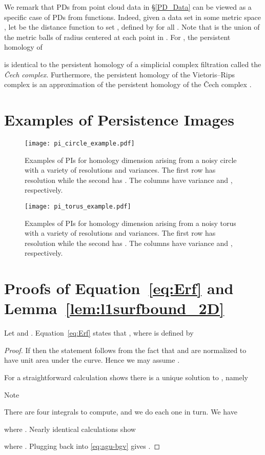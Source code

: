 \documentclass[11pt]{article}
\begin{document}
We remark that PDs from point cloud data in \S\ref{PD_Data} can be viewed as a specific case of PDs from functions. Indeed, given a data set  in some metric space , let  be the distance function to set , defined by  for all . Note that  is the union of the metric balls of radius  centered at each point in . For , the persistent homology of


is identical to the persistent homology of a simplicial complex filtration called the \emph{\v Cech complex}. Furthermore, the persistent homology of the Vietoris--Rips complex is an approximation of the persistent homology of the \v Cech complex \citep[Section~III.2]{Edelsbrunner10}.

\section{Examples of Persistence Images}\label{app:PIEx}

\begin{figure}[H]
\centering
\texttt{[image: pi\_circle\_example.pdf]}
\caption{Examples of PIs for homology dimension  arising from a noisy circle with a variety of resolutions and variances. The first row has resolution  while the second has . The columns have variance  and , respectively.
}
\label{fig:PIsCircle}
\end{figure}

\begin{figure}[H]
\centering
\texttt{[image: pi\_torus\_example.pdf]}
\caption{Examples of PIs for homology dimension  arising from a noisy torus with a variety of resolutions and variances. The first row has resolution  while the second has . The columns have variance  and , respectively.}
\label{fig:PIsTorus}
\end{figure}


\section{Proofs of Equation~\eqref{eq:Erf} and Lemma~\ref{lem:l1surfbound_2D}} \label{app:proofs}

Let  and . Equation~\eqref{eq:Erf} states that , where  is defined by


\begin{proof}
If  then the statement follows from the fact that  and  are normalized to have unit area under the curve. Hence we may assume .

For  a straightforward calculation shows there is a unique solution  to ,
namely

Note

There are four integrals to compute, and we do each one in turn. We have

where . Nearly identical calculations show

where .
Plugging back into \eqref{eq:agu-bgv} gives .
\end{proof}
\end{document}
